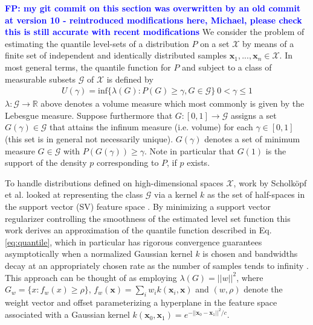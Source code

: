 \documentclass[10pt, conference]{ieeeconf}      %
\newcommand{\bx}{\mathbf{x}}
\newcommand{\fpnote}[1]{\ifthenelse{\boolean{include-notes}}%
 {\textcolor{blue}{\textbf{FP: #1}}}{}}
\begin{document}
\fpnote{my git commit on this section was overwritten by an old commit at version 10 - reintroduced modifications here,
Michael, please check this is still accurate with recent modifications}
We consider the problem of estimating the quantile level-sets of a distribution $P$ on a set $\mathcal{X}$ by means of a finite set of
independent and identically distributed samples $\mathbf{x}_1,...,\mathbf{x}_n\in \mathcal{X}$.
In most general terms, the quantile function for $P$ and subject to a class of measurable subsets $\mathcal{G}$ of $\mathcal{X}$ is
defined by
\begin{align}\label{eq:quantile}
U(\gamma) = \mbox{inf} \lbrace \lambda(G):P(G) \geq \gamma, G \in \mathcal{G} \rbrace \: 0<\gamma \leq 1
\end{align} 
$\lambda:\mathcal{G}\to \mathbb{R}$ above denotes a volume measure which most commonly is given by the Lebesgue measure.
Suppose furthermore that $G:[0,1]\to \mathcal{G}$ assigns a set $G(\gamma) \in \mathcal{G}$ that attains the infinum
measure (i.e. volume) for each $\gamma\in [0,1]$ (this set is in general not necessarily unique). 
$G(\gamma)$ denotes a set of minimum measure $G \in \mathcal{G}$ with $P(G(\gamma))\ge \gamma$. Note in particular that $G(1)$ is the support of the density $p$ corresponding to $P$, if $p$ exists. 

To handle distributions defined on high-dimensional spaces $\mathcal{X}$, work by Scholk{\"o}pf et al. looked at representing the class $\mathcal{G}$ via a kernel $k$ as the set of half-spaces in the support vector (SV) feature space \cite{scholkopf2001estimating}. 
By minimizing a support vector regularizer controlling the smoothness of the estimated level set function this work
derives an approximation of the quantile function described in Eq. \ref{eq:quantile}, which in particular has rigorous
convergence guarantees asymptotically when a normalized Gaussian kernel $k$ is chosen and bandwidths decay at an
appropriately chosen rate as the number of samples tends to infinity \cite{vert2006consistency}.
This approach can be thought of as employing $\lambda(G) = ||w||^2$, where $G_w = \lbrace x: f_w(x) \geq \rho \rbrace$,
$f_w(\mathbf{x}) = \sum_i w_i k(\mathbf{x}_i, \mathbf{x})$
and $(w,\rho)$ denote the weight vector and offset parameterizing a hyperplane in the feature space associated with a
Gaussian kernel $k(\bx_0,\bx_1) = e^{-||\bx_0 - \bx_1||^2/c}$.
\end{document}
